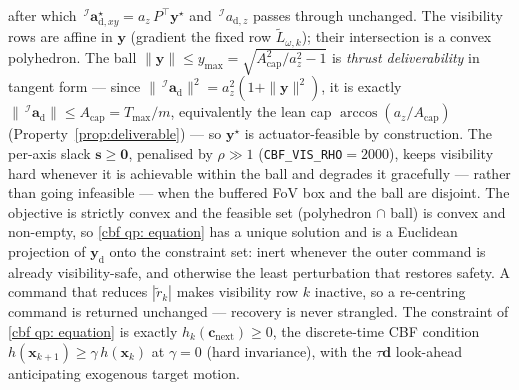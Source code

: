 \documentclass{IEEEtaes}
\theoremstyle{definition}
\theoremstyle{remark}
\begin{document}
after which $\,^\mathcal{I}\boldsymbol{a}^\star_{\text{d},xy}=a_z\,P^\top\boldsymbol{y}^\star$ and $\,^\mathcal{I}a_{\text{d},z}$ passes through unchanged. The visibility rows are affine in $\boldsymbol{y}$ (gradient the fixed row $\tilde{L}_{\omega,k}$); their intersection is a convex polyhedron. The ball $\|\boldsymbol{y}\|\le y_\text{max}=\sqrt{A_\text{cap}^2/a_z^2-1}$ is \emph{thrust deliverability} in tangent form --- since $\|\,^\mathcal{I}\boldsymbol{a}_\text{d}\|^2=a_z^2(1+\|\boldsymbol{y}\|^2)$, it is exactly $\|\,^\mathcal{I}\boldsymbol{a}_\text{d}\|\le A_\text{cap}=T_\text{max}/m$, equivalently the lean cap $\arccos(a_z/A_\text{cap})$ (Property~\ref{prop:deliverable}) --- so $\boldsymbol{y}^\star$ is actuator-feasible by construction. The per-axis slack $\boldsymbol{s}\ge\boldsymbol{0}$, penalised by $\rho\gg1$ (\texttt{CBF\_VIS\_RHO}$=2000$), keeps visibility hard whenever it is achievable within the ball and degrades it gracefully --- rather than going infeasible --- when the buffered FoV box and the ball are disjoint. The objective is strictly convex and the feasible set (polyhedron $\cap$ ball) is convex and non-empty, so \eqref{cbf qp: equation} has a unique solution and is a Euclidean projection of $\boldsymbol{y}_\text{d}$ onto the constraint set: inert whenever the outer command is already visibility-safe, and otherwise the least perturbation that restores safety. A command that reduces $|\tilde r_k|$ makes visibility row $k$ inactive, so a re-centring command is returned unchanged --- recovery is never strangled. The constraint of \eqref{cbf qp: equation} is exactly $h_k(\boldsymbol{c}_\text{next})\ge0$, the discrete-time CBF condition $h(\boldsymbol{x}_{k+1})\ge\gamma\,h(\boldsymbol{x}_k)$ at $\gamma=0$ (hard invariance), with the $\tau\boldsymbol{d}$ look-ahead anticipating exogenous target motion.
\end{document}
